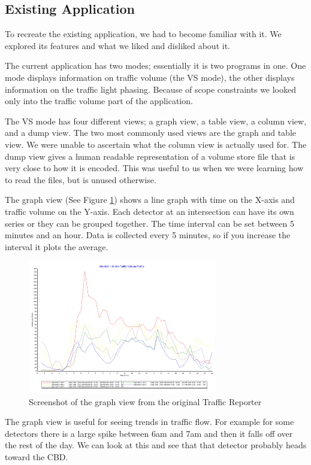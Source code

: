 \documentclass{article}
\begin{document}
\subsection{Existing Application}
To recreate the existing application, we had to become
familiar with it. We explored its features and what we liked
and disliked about it.

The current application has two modes; essentially it is two
programs in one. One mode displays information on traffic
volume (the VS mode), the other displays information on the
traffic light phasing. Because of scope constraints we looked
only into the traffic volume part of the application. 

The VS mode has four different views; a graph view, a
table view, a column view, and a dump view. The two most
commonly used views are the graph and table view. We were
unable to ascertain what the column view is actually used for.
The dump view gives a human readable representation of a
volume store file that is very close to how it is encoded. This
was useful to us when we were learning how to read the files,
but is unused otherwise.

The graph view (See Figure \ref{fig:oldGraph}) shows a line graph with time on the X-axis
and traffic volume on the Y-axis. Each detector at an
intersection can have its own series or they can be grouped
together. The time interval can be set between 5 minutes and
an hour. Data is collected every 5 minutes, so if you increase
the interval it plots the average.

\begin{figure}[!t]
\centerline{\includegraphics[height=2.3in]{oldGraph}}
\caption{Screenshot of the graph view from the original Traffic Reporter}
\label{fig:oldGraph}
\end{figure}

The graph view is useful for seeing trends in traffic flow.
For example for some detectors there is a large spike between
6am and 7am and then it falls off over the rest of the day. We
can look at this and see that that detector probably heads
toward the CBD.
\end{document}
